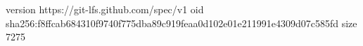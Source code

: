 version https://git-lfs.github.com/spec/v1
oid sha256:f8ffcab684310f9740f775dba89c919feaa0d102e01e211991e4309d07c585fd
size 7275
